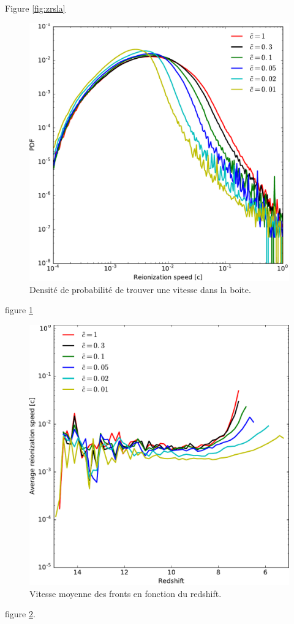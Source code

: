 Figure \ref{fig:zrsla}



\begin{figure}[htpb]
        \includegraphics[width=.95\linewidth]{img/04_mapreio/PDF_v_reio.pdf} 
        \caption{Densité de probabilité de trouver une vitesse dans la boite.
        }
 		\label{fig:pdfv}
\end{figure}

figure \ref{fig:pdfv}



\begin{figure}[htpb]
        \includegraphics[width=.95\linewidth]{img/04_mapreio/avg_reionization_speed.pdf} 
        \caption{Vitesse moyenne des fronts en fonction du redshift.
        }
 		\label{fig:vreioz}
\end{figure}


figure \ref{fig:vreioz}.

